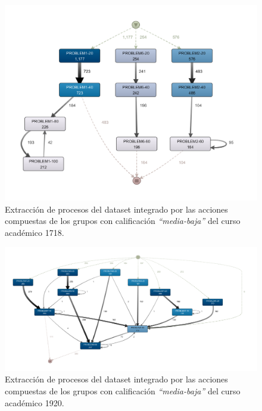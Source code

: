 \begin{figure}[H]
    \centering
    \includegraphics[width=1.25\textwidth]{imagenes/DISCO_compound/Year1718MidLowGrades.png}
    \caption{Extracción de procesos del dataset integrado por las acciones compuestas de los grupos con calificación \emph{``media-baja''} del curso académico 1718.}
    \label{fig:year1718MidLowGrades}
\end{figure}

\begin{figure}[H]
    \centering
    \includegraphics[width=1.25\textwidth]{imagenes/DISCO_compound/Year1920MidLowGrades.png}
    \caption{Extracción de procesos del dataset integrado por las acciones compuestas de los grupos con calificación \emph{``media-baja''} del curso académico 1920.}
    \label{fig:year1920MidLowGrades}
\end{figure}

